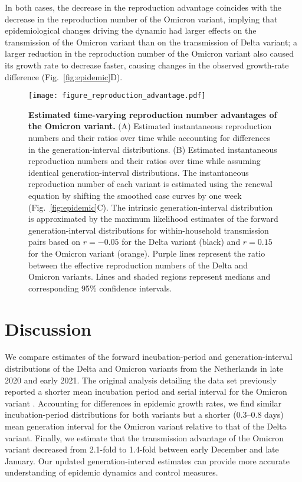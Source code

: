 \documentclass[12pt]{article}
\newcommand{\fref}[1]{Fig.~\ref{fig:#1}}
\begin{document}
In both cases, the decrease in the reproduction advantage coincides with the decrease in the reproduction number of the Omicron variant, implying that epidemiological changes driving the dynamic had larger effects on the transmission of the Omicron variant than on the transmission of Delta variant;
a larger reduction in the reproduction number of the Omicron variant also caused its growth rate to decrease faster, causing changes in the observed growth-rate difference (\fref{epidemic}D).

\begin{figure}[!th]
\texttt{[image: figure\_reproduction\_advantage.pdf]}
\caption{
\textbf{Estimated time-varying reproduction number advantages of the Omicron variant.}
(A) Estimated instantaneous reproduction numbers and their ratios over time while accounting for differences in the generation-interval distributions.
(B) Estimated instantaneous reproduction numbers and their ratios over time while assuming identical generation-interval distributions.
The instantaneous reproduction number of each variant is estimated using the renewal equation by shifting the smoothed case curves by one week (\fref{epidemic}C).
The intrinsic generation-interval distribution is approximated by the maximum likelihood estimates of the forward generation-interval distributions for within-household transmission pairs based on $r=-0.05$ for the Delta variant (black) and $r=0.15$ for the Omicron variant (orange).
Purple lines represent the ratio between the effective reproduction numbers of the Delta and Omicron variants.
Lines and shaded regions represent medians and corresponding 95\% confidence intervals.
\label{fig:reproduction}
}
\end{figure}

\section{Discussion}

We compare estimates of the forward incubation-period and generation-interval distributions of the Delta and Omicron variants from the Netherlands in late 2020 and early 2021.
The original analysis detailing the data set previously reported a shorter mean incubation period and serial interval for the Omicron variant \citep{backer2021omicron}.
Accounting for differences in epidemic growth rates, we find similar incubation-period distributions for both variants but a shorter (0.3--0.8 days) mean generation interval for the Omicron variant relative to that of the Delta variant.
Finally, we estimate that the transmission advantage of the Omicron variant decreased from 2.1-fold to 1.4-fold between early December and late January. 
Our updated generation-interval estimates can provide more accurate understanding of epidemic dynamics and control measures.
\end{document}
